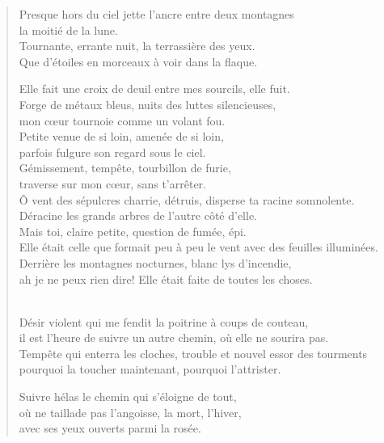 \documentclass[11pt,a4paper]{book}
\begin{document}
\begin{verse}
  Presque hors du ciel jette l'ancre entre deux montagnes \\
  la moitié de la lune. \\
  Tournante, errante nuit, la terrassière des yeux. \\
  Que d'étoiles en morceaux à voir dans la flaque.

  Elle fait une croix de deuil entre mes sourcils, elle fuit. \\
  Forge de métaux bleus, nuits des luttes silencieuses, \\
  mon cœur tournoie comme un volant fou. \\
  Petite venue de si loin, amenée de si loin, \\
  parfois fulgure son regard sous le ciel. \\
  Gémissement, tempête, tourbillon de furie, \\
  traverse sur mon cœur, sans t'arrêter. \\
  Ô vent des sépulcres charrie, détruis, disperse ta racine somnolente. \\
  Déracine les grands arbres de l'autre côté d'elle. \\
  Mais toi, claire petite, question de fumée, épi. \\
  Elle était celle que formait peu à peu le vent avec des feuilles illuminées. \\
  Derrière les montagnes nocturnes, blanc lys d'incendie, \\
  ah je ne peux rien dire! Elle était faite de toutes les choses. \\ \

  Désir violent qui me fendit la poitrine à coups de couteau, \\
  il est l'heure de suivre un autre chemin, où elle ne sourira pas.\\
  Tempête qui enterra les cloches, trouble et nouvel essor des tourments \\
  pourquoi la toucher maintenant, pourquoi l'attrister.

  Suivre hélas le chemin qui s'éloigne de tout, \\
  où ne taillade pas l'angoisse, la mort, l'hiver, \\
  avec ses yeux ouverts parmi la rosée.
\end{verse}

\newpage

\end{document}
